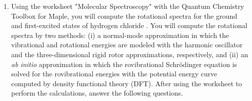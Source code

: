 \documentclass[../psets.tex]{subfiles}
\begin{document}
\begin{enumerate}
\begin{enumerate}
\begin{proof}[Answer]
\begin{equation*}
            \end{equation*}
            implies that
            \begin{align*}
                R_e &= \sqrt{\frac{h}{4\pi^2\mu\cdot 2B}}\\
                \Aboxed{R_e &= \SI{3.05}{\angstrom}}
            \end{align*}
        \end{proof}
        \item In the far infrared region, the molecule  has an intense line at $\SI{278.0}{\per\centi\meter}$. Compute the force constant and the period of vibration for .
        \begin{proof}[Answer]
            From \textcite{bib:McQuarrieSimon}, we know that
            \begin{equation*}
                \tilde{\nu} = \SI{2.780e4}{\per\meter}
            \end{equation*}
            and that
            \begin{equation*}
                \tilde{\nu} = \frac{1}{2\pi c}\sqrt{\frac{k}{\mu}}
            \end{equation*}
            where $k$ is the force constant. This combined with the fact that the reduced mass of  is
            \begin{equation*}
                \mu = \frac{39\cdot 35}{39+35} = \SI{3.06e-26}{\kilo\gram}
            \end{equation*}
            implies that
            \begin{align*}
                k &= 4\pi^2c^2\tilde{\nu}^2\mu\\
                \Aboxed{k &= \SI[per-mode=symbol]{84.0}{\newton\per\meter}}
            \end{align*}
            Additionally, we have that
            \begin{align*}
                T &= 2\pi\sqrt{\frac{\mu}{k}}\\
                \Aboxed{T &= \SI{1.20e-13}{\second}}
            \end{align*}
        \end{proof}
    \end{enumerate}
    \item Using the worksheet "Molecular Spectroscopy" with the Quantum Chemistry Toolbox for Maple, you will compute the rotational spectra for the ground and first-excited states of hydrogen chloride . You will compute the rotational spectra by two methods: (i) a normal-mode approximation in which the vibrational and rotational energies are modeled with the harmonic oscillator and the three-dimensional rigid rotor approximations, respectively, and (ii) an \emph{ab initio} approximation in which the rovibrational Schr\"{o}dinger equation is solved for the rovibrational energies with the potential energy curve computed by density functional theory (DFT). After using the worksheet to perform the calculations, answer the following questions.

\end{enumerate}
\end{document}
